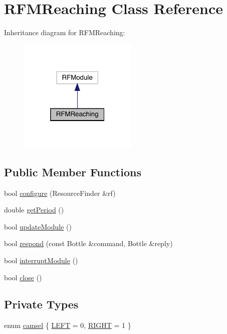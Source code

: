 \hypertarget{classRFMReaching}{}\section{R\+F\+M\+Reaching Class Reference}
\label{classRFMReaching}


Inheritance diagram for R\+F\+M\+Reaching\+:
\nopagebreak
\begin{figure}[H]
\begin{center}
\leavevmode
\includegraphics[width=160pt]{classRFMReaching__inherit__graph}
\end{center}
\end{figure}
\subsection*{Public Member Functions}
\begin{DoxyCompactItemize}
\item 
bool \hyperlink{classRFMReaching_a25566e4f2eed559101a37f284803f852}{configure} (Resource\+Finder \&rf)
\item 
double \hyperlink{classRFMReaching_a25880a55c1cefc2eea1718fca77a9f46}{get\+Period} ()
\item 
bool \hyperlink{classRFMReaching_a8bccf7116a170658acf11c2e0facabee}{update\+Module} ()
\item 
bool \hyperlink{classRFMReaching_a906ec163b5bfe072e988a91dca689110}{respond} (const Bottle \&command, Bottle \&reply)
\item 
bool \hyperlink{classRFMReaching_ac6343eff00e760fe31c56fa76a7e25a0}{interrupt\+Module} ()
\item 
bool \hyperlink{classRFMReaching_a96f96942041fc59fd4b5df9ecdb0fa8e}{close} ()
\end{DoxyCompactItemize}
\subsection*{Private Types}
\begin{DoxyCompactItemize}
\item 
enum \hyperlink{classRFMReaching_a45bcd979839b78397e680a4abc3443e6}{camsel} \{ \hyperlink{classRFMReaching_a45bcd979839b78397e680a4abc3443e6ad951af6aa586c134d51f4e5aee67e842}{L\+E\+FT} = 0, 
\hyperlink{classRFMReaching_a45bcd979839b78397e680a4abc3443e6a4a01bc06177ee8717dad83e5222ca7b1}{R\+I\+G\+HT} = 1
 \}
\end{DoxyCompactItemize}

